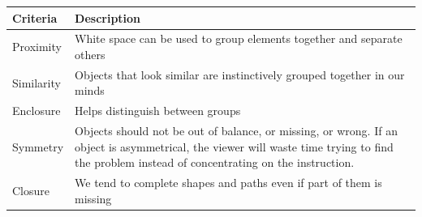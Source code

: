 \documentclass[]{book}
\theoremstyle{definition}
\theoremstyle{definition}
\theoremstyle{definition}
\theoremstyle{remark}
\begin{document}
\begin{longtable}[]{@{}ll@{}}
\toprule
\begin{minipage}[b]{0.18\columnwidth}\raggedright\strut
\textbf{Criteria}\strut
\end{minipage} & \begin{minipage}[b]{0.68\columnwidth}\raggedright\strut
\textbf{Description}\strut
\end{minipage}\tabularnewline
\midrule
\endhead
\begin{minipage}[t]{0.18\columnwidth}\raggedright\strut
Proximity\strut
\end{minipage} & \begin{minipage}[t]{0.68\columnwidth}\raggedright\strut
White space can be used to group elements together and separate
others\strut
\end{minipage}\tabularnewline
\begin{minipage}[t]{0.18\columnwidth}\raggedright\strut
Similarity\strut
\end{minipage} & \begin{minipage}[t]{0.68\columnwidth}\raggedright\strut
Objects that look similar are instinctively grouped together in our
minds\strut
\end{minipage}\tabularnewline
\begin{minipage}[t]{0.18\columnwidth}\raggedright\strut
Enclosure\strut
\end{minipage} & \begin{minipage}[t]{0.68\columnwidth}\raggedright\strut
Helps distinguish between groups\strut
\end{minipage}\tabularnewline
\begin{minipage}[t]{0.18\columnwidth}\raggedright\strut
Symmetry\strut
\end{minipage} & \begin{minipage}[t]{0.68\columnwidth}\raggedright\strut
Objects should not be out of balance, or missing, or wrong. If an object
is asymmetrical, the viewer will waste time trying to find the problem
instead of concentrating on the instruction.\strut
\end{minipage}\tabularnewline
\begin{minipage}[t]{0.18\columnwidth}\raggedright\strut
Closure\strut
\end{minipage} & \begin{minipage}[t]{0.68\columnwidth}\raggedright\strut
We tend to complete shapes and paths even if part of them is
missing\strut
\end{minipage}\tabularnewline

\end{longtable}
\end{document}
